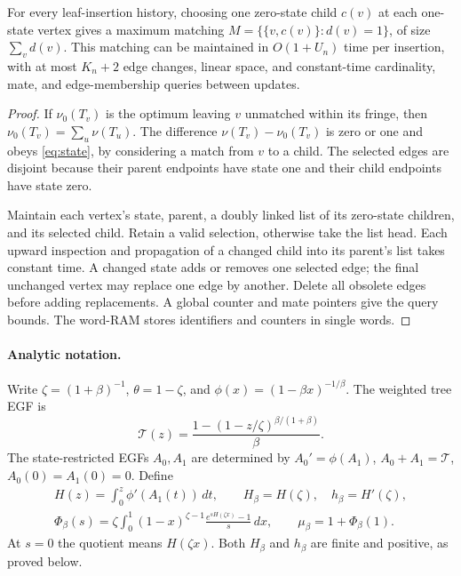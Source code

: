 \documentclass[runningheads,envcountsame,orivec]{llncs}
\begin{document}
\begin{lemma}\label{lem:implementation}
For every leaf-insertion history, choosing one zero-state child $c(v)$
at each one-state vertex gives a maximum matching
$M=\{\{v,c(v)\}:d(v)=1\}$, of size $\sum_vd(v)$.
This matching can be maintained in $O(1+U_n)$ time per insertion,
with at most $K_n+2$ edge changes, linear space, and constant-time
cardinality, mate, and edge-membership queries between updates.
\end{lemma}
\begin{proof}
If $\nu_0(T_v)$ is the optimum leaving $v$ unmatched within its
fringe, then $\nu_0(T_v)=\sum_u\nu(T_u)$.
The difference $\nu(T_v)-\nu_0(T_v)$ is zero or one and obeys
\eqref{eq:state}, by considering a match from $v$ to a child.
The selected edges are disjoint because their parent endpoints have
state one and their child endpoints have state zero.

Maintain each vertex's state, parent, a doubly linked list of its
zero-state children, and its selected child. Retain a valid selection,
otherwise take the list head. Each upward inspection and propagation
of a changed child into its parent's list takes constant time.
A changed state adds or removes one selected edge; the final unchanged
vertex may replace one edge by another. Delete all obsolete edges
before adding replacements. A global counter and mate pointers give
the query bounds. The word-RAM stores identifiers and counters in
single words.
\end{proof}

\paragraph{Analytic notation.}
Write $\zeta=(1+\beta)^{-1}$, $\theta=1-\zeta$, and
$\phi(x)=(1-\beta x)^{-1/\beta}$. The weighted tree EGF is
\[
 \mathcal T(z)=\frac{1-(1-z/\zeta)^{\beta/(1+\beta)}}\beta.
\]
The state-restricted EGFs $A_0,A_1$ are determined by
$A_0'=\phi(A_1)$, $A_0+A_1=\mathcal T$, $A_0(0)=A_1(0)=0$.
Define
\begin{equation}\label{eq:affinelimitfunctions}
 \begin{gathered}
 H(z)=\int_0^z\phi'(A_1(t))\,dt,\qquad
 H_\beta=H(\zeta),\quad h_\beta=H'(\zeta),\\
 \Phi_\beta(s)=\zeta\int_0^1(1-x)^{\zeta-1}
       \frac{e^{sH(\zeta x)}-1}{s}\,dx,\qquad
 \mu_\beta=1+\Phi_\beta(1).
 \end{gathered}
\end{equation}
At $s=0$ the quotient means $H(\zeta x)$.
Both $H_\beta$ and $h_\beta$ are finite and positive, as proved below.
\end{document}
